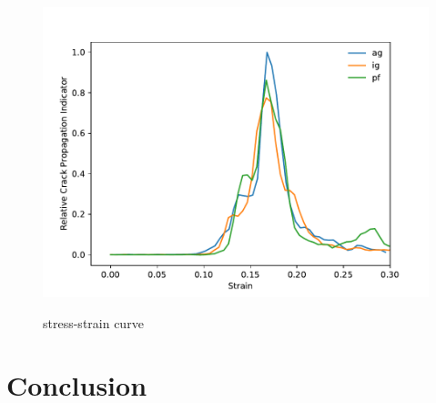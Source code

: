 \documentclass[final,5pt,times]{elsarticle}
\begin{document}
	
	\begin{figure}[h]
		\centering
		\includegraphics[width=0.7\linewidth]{img/1stdiv}
		\label{fig:surf}
		\caption{stress-strain curve}
	\end{figure}
	
	
	\section{Conclusion}
	
	
	
\end{document}
